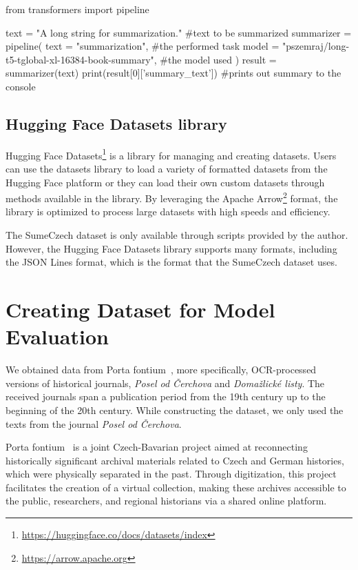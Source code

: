 \documentclass[english, ba, kiv, he, iso690numb, pdf, viewonly]{fasthesis}
\begin{document}

\begin{pythoncode}[language=Python, caption={Text summarization inference example using pipeline\label{hf:pipeline_example}}] 
	from transformers import pipeline
	
	text = "A long string for summarization." #text to be summarized
	summarizer = pipeline(
	text = "summarization", #the performed task 
	model = "pszemraj/long-t5-tglobal-xl-16384-book-summary", #the model used
	)
	result = summarizer(text)
	print(result[0]['summary_text']) #prints out summary to the console
\end{pythoncode}

\subsection{Hugging Face Datasets library}
Hugging Face Datasets\footnote{\url{https://huggingface.co/docs/datasets/index}} is a library for managing and creating datasets. Users can use the datasets library to load a variety of formatted datasets from the Hugging Face platform or they can load their own custom datasets through methods available in the library. By leveraging the Apache Arrow\footnote{\url{https://arrow.apache.org}} format, the library is optimized to process large datasets with high speeds and efficiency.

The SumeCzech dataset is only available through scripts provided by the author. However, the Hugging Face Datasets library supports many formats, including the JSON Lines format, which is the format that the SumeCzech dataset uses. 

\section{Creating Dataset for Model Evaluation} \label{impl:dataset}
We obtained data from Porta fontium~\cite{statni-oblastni-archiv-v-plzni-no-date}, more specifically, OCR-processed versions of historical journals, \textit{Posel od Čerchova} and \textit{Domažlické listy}. The received journals span a publication period from the 19th century up to the beginning of the 20th century. While constructing the dataset, we only used the texts from the journal \textit{Posel od Čerchova}.

Porta fontium~\cite{statni-oblastni-archiv-v-plzni-no-date} is a joint Czech-Bavarian project aimed at reconnecting historically significant archival materials related to Czech and German histories, which were physically separated in the past. Through digitization, this project facilitates the creation of a virtual collection, making these archives accessible to the public, researchers, and regional historians via a shared online platform.
\end{document}
